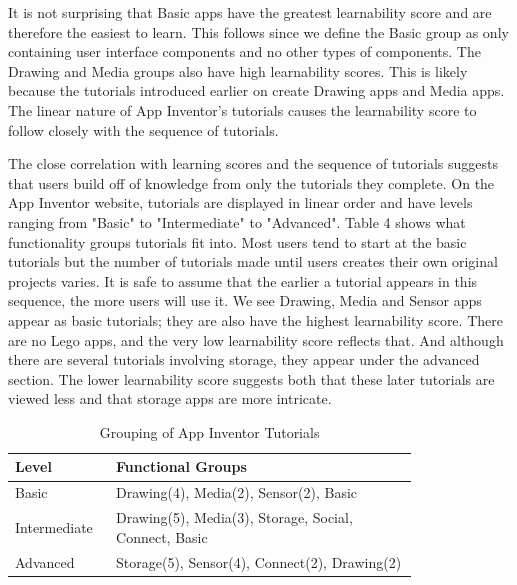 \documentclass[conference]{IEEEtran}
\begin{document}
It is not surprising that Basic apps have the greatest learnability score and are therefore the easiest to learn. This follows since we define the Basic group as only containing user interface components and no other types of components. The Drawing and Media groups also have high learnability scores. This is likely because the tutorials introduced earlier on create Drawing apps and Media apps. The linear nature of App Inventor's tutorials causes the learnability score to follow closely with the sequence of tutorials.

The close correlation with learning scores and the sequence of tutorials suggests that users build off of knowledge from only the tutorials they complete. On the App Inventor website, tutorials are displayed in linear order and have levels ranging from "Basic" to "Intermediate" to "Advanced".\cite{ai_tutorials} Table 4 shows what functionality groups tutorials fit into. Most users tend to start at the basic tutorials but the number of tutorials made until users creates their own original projects varies. It is safe to assume that the earlier a tutorial appears in this sequence, the more users will use it. We see Drawing, Media and Sensor apps appear as basic tutorials; they are also have the highest learnability score. There are no Lego apps, and the very low learnability score reflects that. And although there are several tutorials involving storage, they appear under the advanced section. The lower learnability score suggests both that these later tutorials are viewed less and that storage apps are more intricate.

\begin{table}[h!]
\renewcommand{\arraystretch}{1.3}
\caption{Grouping of App Inventor Tutorials}
\label{table_tutorial_group}
\centering
\begin{tabular}{| p{0.15\linewidth} | p{0.65\linewidth} | }
\hline

Level&
Functional Groups\\
\hline \hline
Basic&
Drawing(4), Media(2), Sensor(2), Basic\\
\hline 
Intermediate&
Drawing(5), Media(3), Storage, Social, Connect, Basic\\
\hline
Advanced&
Storage(5), Sensor(4), Connect(2), Drawing(2)\\

\hline

\end{tabular}
\end{table}
\end{document}
